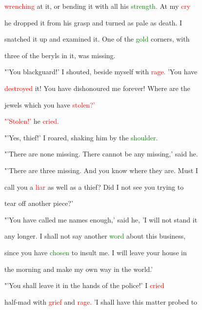  \textcolor{red}{wrenching} at it, or bending it with all his \textcolor{green}{strength.} At my \textcolor{red}{cry}

 he dropped it from his grasp and turned as pale as \textcolor{BurntOrange}{death.} I

 snatched it up and examined it. One of the \textcolor{green}{gold} corners, with

 three of the beryls in it, was missing.



 "'You blackguard!' I \textcolor{BurntOrange}{shouted,} beside myself with \textcolor{red}{rage.} 'You have

 \textcolor{red}{destroyed} it! You have dishonoured me forever! Where are the

 jewels which you have \textcolor{red}{stolen?'}



 \textcolor{red}{"'Stolen!'} he \textcolor{red}{cried.}



 "'Yes, \textcolor{BurntOrange}{thief!'} I roared, shaking him by the \textcolor{green}{shoulder.}



 "'There are none missing. There cannot be any missing,' said he.



 "'There are three missing. And you know where they are. Must I

 call you a \textcolor{red}{liar} as well as a \textcolor{BurntOrange}{thief?} Did I not see you trying to

 tear off another piece?'



 "'You have called me names enough,' said he, 'I will not stand it

 any longer. I shall not say another \textcolor{green}{word} about this business,

 since you have \textcolor{green}{chosen} to \textcolor{BurntOrange}{insult} me. I will \textcolor{BurntOrange}{leave} your house in

 the morning and make my own way in the world.'



 "'You shall \textcolor{BurntOrange}{leave} it in the hands of the \textcolor{BurntOrange}{police!'} I \textcolor{red}{cried}

 half-mad with \textcolor{red}{grief} and \textcolor{red}{rage.} 'I shall have this matter probed to


